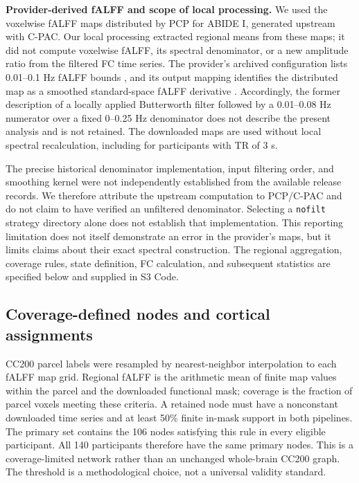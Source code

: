 \documentclass[10pt,letterpaper]{article}
\begin{document}
\textbf{Provider-derived fALFF and scope of local processing.}
We used the voxelwise fALFF maps distributed by PCP for ABIDE I, generated
upstream with C-PAC. Our local processing extracted regional means from these
maps; it did not compute voxelwise fALFF, its spectral denominator, or a new
amplitude ratio from the filtered FC time series. The provider's archived
configuration lists 0.01--0.1 Hz fALFF bounds \cite{PCPconfigRevision}, and its
output mapping identifies the distributed map as a smoothed standard-space
fALFF derivative \cite{PCPmappingRevision}. Accordingly, the former description
of a locally applied Butterworth filter followed by a 0.01--0.08 Hz numerator
over a fixed 0--0.25 Hz denominator does not describe the present analysis and
is not retained. The downloaded maps are used without local spectral
recalculation, including for participants with TR of 3 s.

The precise historical denominator implementation, input filtering order, and
smoothing kernel were not independently established from the available
release records. We therefore attribute the upstream computation to PCP/C-PAC
and do not claim to have verified an unfiltered denominator. Selecting a
\texttt{nofilt} strategy directory alone does not establish that implementation.
This reporting limitation does not itself demonstrate an error in the provider's
maps, but it limits claims about their exact spectral construction. The
regional aggregation, coverage rules, state definition, FC calculation, and
subsequent statistics are specified below and supplied in S3 Code.

\subsection*{Coverage-defined nodes and cortical assignments}
CC200 parcel labels were resampled by nearest-neighbor interpolation to each
fALFF map grid. Regional fALFF is the arithmetic mean of finite map values within
the parcel and the downloaded functional mask; coverage is the fraction of parcel
voxels meeting these criteria. A retained node must have a nonconstant downloaded
time series and at least 50\% finite in-mask support in both pipelines.
The primary set contains the 106 nodes satisfying this rule in every eligible
participant. All 140 participants therefore have the same primary nodes.
This is a coverage-limited network rather than an unchanged whole-brain CC200 graph.
The threshold is a methodological choice, not a universal validity standard.
\end{document}
